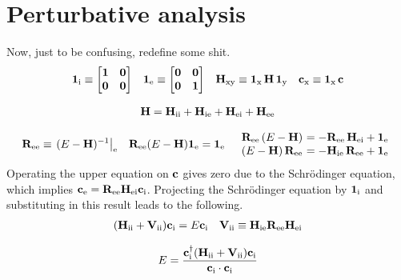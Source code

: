 \documentclass[11pt]{article}
\numberwithin{equation}{section}
\begin{document}
\setlength{\abovedisplayskip}{3pt}
\setlength{\belowdisplayskip}{3pt}



\setcounter{section}{6}
\section{Perturbative analysis}

Now, just to be confusing, redefine some shit.
\begin{align}
  \bo{1}_\mr{i}
\equiv
\pma[l]{
  \bo{1} & \bo{0} \\
  \bo{0} & \bo{0}
}
&&
  \bo{1}_\mr{e}
\equiv
\pma[l]{
  \bo{0} & \bo{0} \\
  \bo{0} & \bo{1}
}
&&
  \bo{H}_\mr{xy}
\equiv
  \bo{1}_\mr{x}\,
  \bo{H}\,
  \bo{1}_\mr{y}
&&
  \bo{c}_\mr{x}
\equiv
  \bo{1}_\mr{x}\,
  \bo{c}
\end{align}

\begin{align}
  \mathbf{H}
=
  \mathbf{H}_{\mathrm{ii}}
+
  \mathbf{H}_{\mathrm{ie}}
+
  \mathbf{H}_{\mathrm{ei}}
+
  \mathbf{H}_{\mathrm{ee}}
\end{align}

\begin{align}
  \bo{R}_\mr{ee}
\equiv
\left.
  (
    E
  -
    \bo{H}
  )^{-1}
\right|_\mr{e}
&&
  \bo{R}_\mr{ee}
  (
    E
  -
    \bo{H}
  )
  \bo{1}_\mr{e}
=
  \bo{1}_\mr{e}
&&
\begin{array}{r@{\ }l}
  \bo{R}_\mr{ee}\,
  (
    E
  -
    \bo{H}
  )
&=
-
  \bo{R}_\mr{ee}\,
  \bo{H}_\mr{ei}
+
  \bo{1}_\mr{e}
\\
  (
    E
  -
    \bo{H}
  )\,
  \bo{R}_\mr{ee}
&=
-
  \bo{H}_\mr{ie}\,
  \bo{R}_\mr{ee}
+
  \bo{1}_\mr{e}
\end{array}
\end{align}
Operating the upper equation on $\mathbf{c}$ gives zero due to the Schr\"odinger equation, which implies
$
  \mathbf{c}_{\mathrm{e}}
=
  \mathbf{R}_{\mathrm{ee}}
  \mathbf{H}_{\mathrm{ei}}
  \mathbf{c}_{\mathrm{i}}
$.
Projecting the Schr\"odinger equation by $\mathbf{1}_{\mathrm{i}}$ and substituting in this result leads to the following.
\begin{align}
  (
    \mathbf{H}_{\mathrm{ii}}
  +
    \mathbf{V}_{\mathrm{ii}}
  )
  \mathbf{c}_{\mathrm{i}}
=
  E
  \mathbf{c}_{\mathrm{i}}
&&
  \mathbf{V}_{\mathrm{ii}}
\equiv
  \mathbf{H}_{\mathrm{ie}}
  \mathbf{R}_{\mathrm{ee}}
  \mathbf{H}_{\mathrm{ei}}
\end{align}

\begin{align}
  E
=
  \frac {
    \mathbf{c}_{\mathrm{i}}^\dagger
    (
      \mathbf{H}_{\mathrm{ii}}
    +
      \mathbf{V}_{\mathrm{ii}}
    )
    \mathbf{c}_{\mathrm{i}}
  }{
    \mathbf{c}_{\mathrm{i}}\cdot
    \mathbf{c}_{\mathrm{i}}
  }
\end{align}
\end{document}
